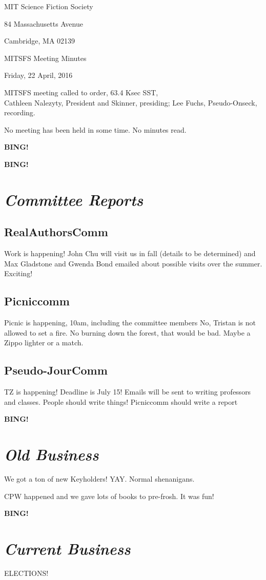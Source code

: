 \documentclass[10pt]{article}
\newcommand{\bing}{{\bf BING!} }
\newcommand{\goto}[1]{\bing \vskip 12pt \section*{{\em{#1}}}}
\newcommand{\skinner}{Cathleen Nalezyty, President and Skinner}
\newcommand{\onseck}{Lee Fuchs, Pseudo-Onseck}
\newcommand{\meetingdate}{Friday, 22 April, 2016}
\begin{document}
\begin{center}

MIT Science Fiction Society

84 Massachusetts Avenue

Cambridge, MA 02139

\vspace{12pt}

MITSFS Meeting Minutes

\meetingdate

\end{center}

\vspace{18pt}

\setlength{\parskip}{6pt}

\noindent
MITSFS meeting called to order, 63.4 Ksec SST, \\
\skinner, presiding; \onseck, recording.

No meeting has been held in some time.  No minutes read.

\bing

\goto{Committee Reports}
\subsection*{RealAuthorsComm}
Work is happening! John Chu will visit us in fall (details to be determined) and Max Gladstone and Gwenda Bond emailed about possible visits over the summer. Exciting!

\subsection*{Picniccomm}
Picnic is happening, 10am, including the committee members
No, Tristan is not allowed to set a fire. No burning down the forest, that would be bad. Maybe a Zippo lighter or a match.

\subsection*{Pseudo-JourComm}
TZ is happening! Deadline is July 15! Emails will be sent to writing professors and classes. People should write things! Picniccomm should write a report

\goto{Old Business}
We got a ton of new Keyholders! YAY. Normal shenanigans.

CPW happened and we gave lots of books to pre-frosh. It was fun!

\goto{Current Business}
ELECTIONS!
\end{document}
